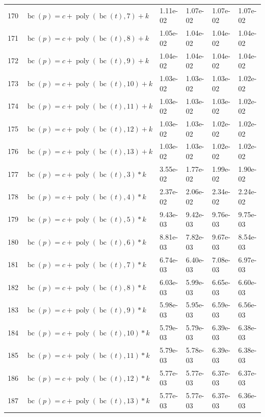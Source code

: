 \documentclass[12pt,a4paper]{article}
\DeclareMathOperator{\bc}{bc}
\DeclareMathOperator{\poly}{poly}
\begin{document}
\begin{longtable}[t]{ll>{\raggedleft\arraybackslash}p{2cm}>{\raggedleft\arraybackslash}p{2cm}>{\raggedleft\arraybackslash}p{2cm}>{\raggedleft\arraybackslash}p{2cm}}
170 & $\bc(p) = c + \poly\left( \bc(t), 7 \right) + k$ & 1.11e-02 & 1.07e-02 & 1.07e-02 & 1.07e-02\\
\rowcolor{gray!6}  171 & $\bc(p) = c + \poly\left( \bc(t), 8 \right) + k$ & 1.05e-02 & 1.04e-02 & 1.04e-02 & 1.04e-02\\
172 & $\bc(p) = c + \poly\left( \bc(t), 9 \right) + k$ & 1.04e-02 & 1.04e-02 & 1.04e-02 & 1.04e-02\\
\rowcolor{gray!6}  173 & $\bc(p) = c + \poly\left( \bc(t), 10 \right) + k$ & 1.03e-02 & 1.03e-02 & 1.03e-02 & 1.02e-02\\
174 & $\bc(p) = c + \poly\left( \bc(t), 11 \right) + k$ & 1.03e-02 & 1.03e-02 & 1.03e-02 & 1.02e-02\\
\rowcolor{gray!6}  175 & $\bc(p) = c + \poly\left( \bc(t), 12 \right) + k$ & 1.03e-02 & 1.03e-02 & 1.02e-02 & 1.02e-02\\
176 & $\bc(p) = c + \poly\left( \bc(t), 13 \right) + k$ & 1.03e-02 & 1.03e-02 & 1.02e-02 & 1.02e-02\\
\rowcolor{gray!6}  177 & $\bc(p) = c + \poly\left( \bc(t), 3 \right) * k$ & 3.55e-02 & 1.77e-02 & 1.99e-02 & 1.90e-02\\
178 & $\bc(p) = c + \poly\left( \bc(t), 4 \right) * k$ & 2.37e-02 & 2.06e-02 & 2.34e-02 & 2.24e-02\\
\rowcolor{gray!6}  179 & $\bc(p) = c + \poly\left( \bc(t), 5 \right) * k$ & 9.43e-03 & 9.42e-03 & 9.76e-03 & 9.75e-03\\
180 & $\bc(p) = c + \poly\left( \bc(t), 6 \right) * k$ & 8.81e-03 & 7.82e-03 & 9.67e-03 & 8.54e-03\\
\rowcolor{gray!6}  181 & $\bc(p) = c + \poly\left( \bc(t), 7 \right) * k$ & 6.74e-03 & 6.40e-03 & 7.08e-03 & 6.97e-03\\
182 & $\bc(p) = c + \poly\left( \bc(t), 8 \right) * k$ & 6.03e-03 & 5.99e-03 & 6.65e-03 & 6.60e-03\\
\rowcolor{gray!6}  183 & $\bc(p) = c + \poly\left( \bc(t), 9 \right) * k$ & 5.98e-03 & 5.95e-03 & 6.59e-03 & 6.56e-03\\
184 & $\bc(p) = c + \poly\left( \bc(t), 10 \right) * k$ & 5.79e-03 & 5.79e-03 & 6.39e-03 & 6.38e-03\\
\rowcolor{gray!6}  185 & $\bc(p) = c + \poly\left( \bc(t), 11 \right) * k$ & 5.79e-03 & 5.78e-03 & 6.39e-03 & 6.38e-03\\
186 & $\bc(p) = c + \poly\left( \bc(t), 12 \right) * k$ & 5.77e-03 & 5.77e-03 & 6.37e-03 & 6.37e-03\\
\rowcolor{gray!6}  187 & $\bc(p) = c + \poly\left( \bc(t), 13 \right) * k$ & 5.77e-03 & 5.77e-03 & 6.37e-03 & 6.36e-03\\

\end{longtable}
\end{document}
